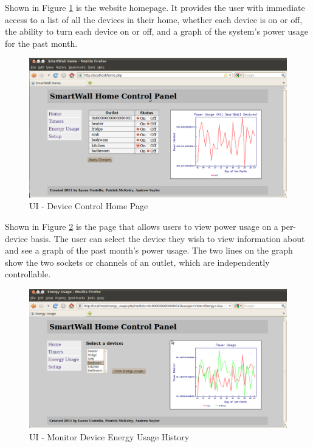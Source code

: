 \documentclass[11pt]{article}
\begin{document}
Shown in Figure \ref{fig:webUI-home} is the website homepage. It provides the
user with immediate access to a list of all the devices in their
home, whether each device is on or off, the ability to turn each
device on or off, and a graph of the system's power usage for the
past month. 

\begin{figure}
  \begin{center}
    \includegraphics[scale=.3]{webUI-home.png}
  \end{center}
  \caption{UI - Device Control Home Page}
  \label{fig:webUI-home}
\end{figure}

Shown in Figure \ref{fig:webUI-energy} is the page that allows users
to view power usage on
a per-device basis. The user can select the device they wish to
view information about and see a graph of the past month’s power
usage. The two lines on the graph show the two sockets or
channels of an outlet, which are independently controllable. 

\begin{figure}
  \begin{center}
    \includegraphics[scale=.3]{webUI-energy.png}
  \end{center}
  \caption{UI - Monitor Device Energy Usage History}
  \label{fig:webUI-energy}
\end{figure}
\end{document}

